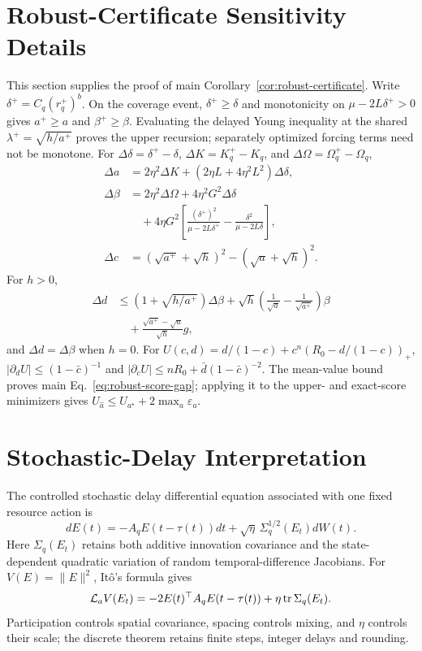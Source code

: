 \documentclass[journal]{IEEEtran}
\newcommand{\tr}{\operatorname{tr}}
\begin{document}
\section{Robust-Certificate Sensitivity Details}
This section supplies the proof of main Corollary~\ref{cor:robust-certificate}.
Write $\delta^+=C_q(r_q^+)^b$.
On the coverage event, $\delta^+\ge\delta$ and monotonicity on $\mu-2L\delta^+>0$ gives $a^+\ge a$ and $\beta^+\ge\beta$.
Evaluating the delayed Young inequality at the shared $\lambda^+=\sqrt{h/a^+}$ proves the upper recursion; separately optimized forcing terms need not be monotone.
For $\Delta\delta=\delta^+-\delta$, $\Delta K=K_q^+-K_q$, and $\Delta\Omega=\Omega_q^+-\Omega_q$,
\begin{align}
\Delta a
&=2\eta^2\Delta K+(2\eta L+4\eta^2L^2)\Delta\delta,\nonumber\\
\Delta\beta
&=2\eta^2\Delta\Omega+4\eta^2G^2\Delta\delta\nonumber\\
&\quad+4\eta G^2\left[
\frac{(\delta^+)^2}{\mu-2L\delta^+}
-\frac{\delta^2}{\mu-2L\delta}
\right],\nonumber\\
\Delta c
&=(\sqrt{a^+}+\sqrt h)^2-(\sqrt a+\sqrt h)^2.
\end{align}
For $h>0$,
\begin{align}
\Delta d
&\le(1+\sqrt{h/a^+})\Delta\beta
+\sqrt h\left(\frac1{\sqrt a}-\frac1{\sqrt{a^+}}\right)\beta\nonumber\\
&\quad+\frac{\sqrt{a^+}-\sqrt a}{\sqrt h}g,
\end{align}
and $\Delta d=\Delta\beta$ when $h=0$.
For $U(c,d)=d/(1-c)+c^n(R_0-d/(1-c))_+$, $|\partial_dU|\le(1-\bar c)^{-1}$ and $|\partial_cU|\le nR_0+\bar d(1-\bar c)^{-2}$.
The mean-value bound proves main Eq.~\eqref{eq:robust-score-gap}; applying it to the upper- and exact-score minimizers gives $U_{\widehat a}\le U_{a^\star}+2\max_a\varepsilon_a$.

\section{Stochastic-Delay Interpretation}
The controlled stochastic delay differential equation associated with one fixed resource action is
\begin{equation}
dE(t)=-A_qE(t-\tau(t))dt
+\sqrt{\eta}\,\Sigma_q^{1/2}(E_t)dW(t).
\end{equation}
Here $\Sigma_q(E_t)$ retains both additive innovation covariance and the state-dependent quadratic variation of random temporal-difference Jacobians.
For $V(E)=\|E\|^2$, It\^o's formula gives
\begin{equation}
{\cal L}_aV(E_t)
=-2E(t)^\top A_qE(t-\tau(t))
+\eta\tr\Sigma_q(E_t).
\end{equation}
Participation controls spatial covariance, spacing controls mixing, and $\eta$ controls their scale; the discrete theorem retains finite steps, integer delays and rounding.
\end{document}

